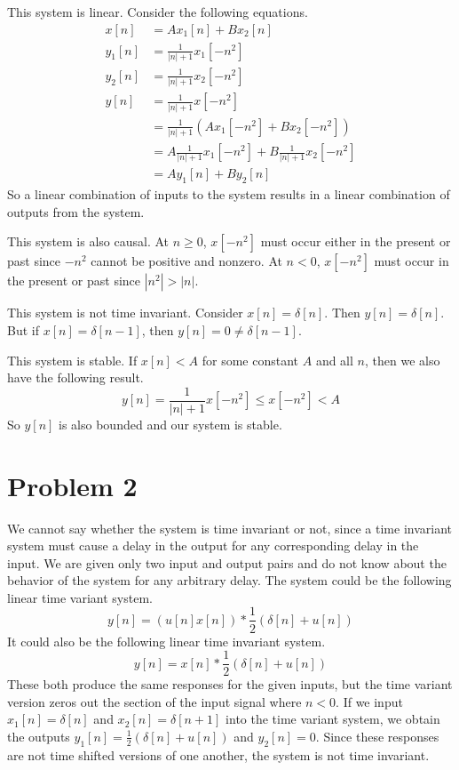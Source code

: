 \documentclass[12pt]{article}
\begin{document}
This system is linear. Consider the following equations.
\begin{align*}
    x[n] &= Ax_1[n]+Bx_2[n]\\
    y_1[n] &=\frac{1}{|n|+1}x_1[-n^2]\\
    y_2[n] &=\frac{1}{|n|+1}x_2[-n^2]\\
    y[n]&=\frac{1}{|n|+1}x[-n^2]\\
    &=\frac{1}{|n|+1}(Ax_1[-n^2]+Bx_2[-n^2])\\
    &=A\frac{1}{|n|+1}x_1[-n^2]+B\frac{1}{|n|+1}x_2[-n^2]\\
    &=Ay_1[n]+By_2[n]
\end{align*}
So a linear combination of inputs to the system results in a linear combination of outputs from the system.

This system is also causal. At \(n\geq0\), \(x[-n^2]\) must occur either in the present or past since \(-n^2\) cannot be
positive and nonzero. At \(n<0\), \(x[-n^2]\) must occur in the present or past since \(|n^2|>|n|\).

This system is not time invariant. Consider \(x[n]=\delta[n]\). Then \(y[n]=\delta[n]\). But if \(x[n]=\delta[n-1]\),
then \(y[n]=0\neq\delta[n-1]\).

This system is stable. If \(x[n]<A\) for some constant \(A\) and all \(n\), then we also have the following result.
\[y[n]=\frac{1}{|n|+1}x[-n^2]\leq x[-n^2]<A\]
So \(y[n]\) is also bounded and our system is stable.

\section*{Problem 2}

We cannot say whether the system is time invariant or not, since a time invariant system must cause a delay in the
output for any corresponding delay in the input. We are given only two input and output pairs and do not know about
the behavior of the system for any arbitrary delay. The system could be the following linear time variant system.
\[y[n]=(u[n]x[n])*\frac{1}{2}(\delta[n]+u[n])\]
It could also be the following linear time invariant system.
\[y[n]=x[n]*\frac{1}{2}(\delta[n]+u[n])\]
These both produce the same responses for the given inputs, but the time variant version zeros out the section of the input
signal where \(n<0\). If we input \(x_1[n]=\delta[n]\) and \(x_2[n]=\delta[n+1]\) into the time variant system, we obtain
the outputs \(y_1[n]=\frac{1}{2}(\delta[n]+u[n])\) and \(y_2[n]=0\). Since these responses are not time shifted versions
of one another, the system is not time invariant.
\end{document}
